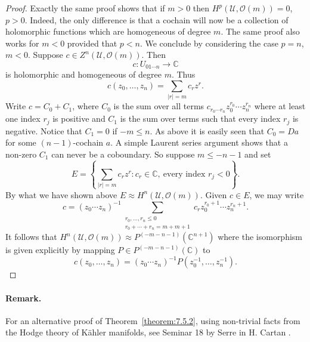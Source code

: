 \begin{proof}
Exactly the same proof shows that if $m>0$ then $H^p(\mathcal U,\mathcal O(m))=0$, $p>0$. Indeed, the only difference is that a cochain will now be a collection of holomorphic functions which are homogeneous of degree $m$. The same proof also works for $m<0$ provided that $p<n$. We conclude by considering the case $p=n$, $m<0$. Suppose $c\in Z^n(\mathcal U,\mathcal O(m))$. Then
\[
c:U_{01\cdots n}\to\mathbb C
\]
is holomorphic and homogeneous of degree $m$. Thus
\[
c(z_0,\ldots,z_n)=\sum_{|r|=m}c_rz^r.
\]
Write $c=C_0+C_1$, where $C_0$ is the sum over all terms $c_{r_0\cdots r_n}z_0^{r_0}\cdots z_n^{r_n}$ where at least one index $r_j$ is positive and $C_1$ is the sum over terms such that every index $r_j$ is negative. Notice that $C_1=0$ if $-m\leq n$. As above it is easily seen that $C_0=Da$ for some $(n-1)$-cochain $a$. A simple Laurent series argument shows that a non-zero $C_1$ can never be a coboundary. So suppose $m\leq-n-1$ and set
\[
E=\left\{\sum_{|r|=m}c_rz^r:c_r\in\mathbb C,\ \text{every index }r_j<0\right\}.
\]
By what we have shown above $E\approx H^n(\mathcal U,\mathcal O(m))$. Given $c\in E$, we may write
\[
c=(z_0\cdots z_n)^{-1}\sum_{\substack{r_0,\ldots,r_n\leq0\\r_0+\cdots+r_n=m+m+1}}c_rz_0^{r_0+1}\cdots z_n^{r_n+1}.
\]
It follows that $H^n(\mathcal U,\mathcal O(m))\approx P^{(-m-n-1)}(\mathbb C^{n+1})$ where the isomorphism is given explicitly by mapping $P\in P^{(-m-n-1)}(\mathbb C)$ to
\[
c(z_0,\ldots,z_n)=(z_0\cdots z_n)^{-1}P(z_0^{-1},\ldots,z_n^{-1}).
\]
\end{proof}
\paragraph{Remark.} For an alternative proof of Theorem~\ref{theorem:7.5.2}, using non-trivial facts from the Hodge theory of K\"ahler manifolds, see Seminar 18 by Serre in H. Cartan \cite{bib:II:cartan-h:2}.

